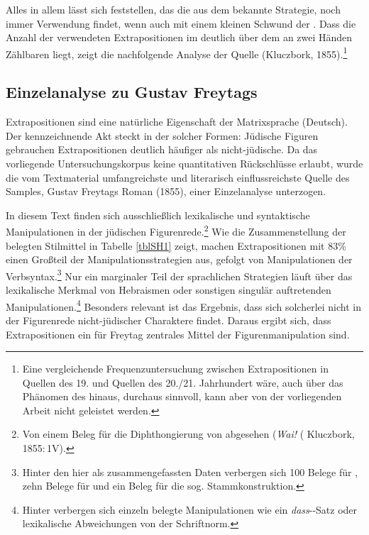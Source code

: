 Alles in allem lässt sich feststellen, das die aus dem \hai{{\LiJieins}} bekannte Strategie, noch immer Verwendung findet, wenn auch mit einem kleinen Schwund der . Dass die Anzahl der verwendeten Extrapositionen im \hai{{\LiJieins}} deutlich über dem an zwei Händen Zählbaren liegt, zeigt die nachfolgende Analyse der Quelle  (Kluczbork, 1855).\footnote{Eine vergleichende Frequenzuntersuchung zwischen Extrapositionen in Quellen des 19. und Quellen des 20./21. Jahrhundert wäre, auch über das Phänomen des \hai{{\LiJi}} hinaus, durchaus sinnvoll, kann aber von der vorliegenden Arbeit nicht geleistet werden.}\\
  
 
       
      \subsection{Einzelanalyse zu Gustav Freytags }\label{sollhaben}
Extrapositionen sind eine natürliche Eigenschaft der Matrixsprache (Deutsch).
Der kennzeichnende Akt steckt in der  solcher Formen: Jüdische Figuren gebrauchen Extrapositionen deutlich häufiger als nicht-jüdische. Da das vorliegende Untersuchungskorpus keine quantitativen Rückschlüsse erlaubt, wurde die vom Textmaterial umfangreichste und literarisch einflussreichste Quelle des Samples, Gustav Freytags Roman  (1855), einer Einzelanalyse unterzogen. 

 In diesem Text finden sich ausschließlich lexikalische und syntaktische Manipulationen in der jüdischen Figurenrede.\footnote{Von einem Beleg für die Diphthongierung von  abgesehen (\textit{Wai!}  ( Kluczbork, 1855:\,1V).} Wie die Zusammenstellung der belegten Stilmittel in Tabelle \ref{tblSH1} zeigt, machen Extrapositionen mit 83\% einen Großteil der Manipulationsstrategien aus, gefolgt von Manipulationen der Verbsyntax.\footnote{Hinter den hier als  zusammengefassten Daten verbergen sich 100 Belege für \hai{{\VR}}, zehn Belege für \hai{{\VPR}} und ein Beleg für die sog. Stammkonstruktion.} Nur ein marginaler Teil der sprachlichen Strategien läuft über das lexikalische Merkmal von Hebraismen oder sonstigen singulär auftretenden Manipulationen.\footnote{Hinter  verbergen sich einzeln belegte Manipulationen wie ein \textit{dass}--Satz oder lexikalische Abweichungen von der Schriftnorm.} Besonders relevant ist das Ergebnis, dass sich solcherlei nicht in der Figurenrede nicht-jüdischer Charaktere findet. Daraus ergibt sich, dass Extrapositionen ein für Freytag zentrales Mittel der Figurenmanipulation sind. \,%

